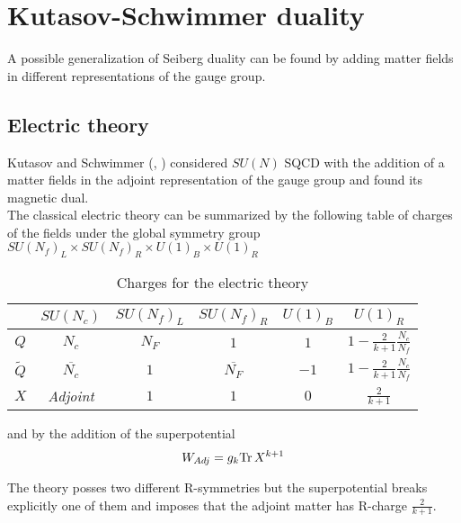 


\section{Kutasov-Schwimmer duality}

A possible generalization of Seiberg duality can be found by adding matter fields in different representations of the gauge group. \\

\subsection{Electric theory }
Kutasov and Schwimmer (\cite{Kutasov:1995ve}, \cite{Kutasov:1995np}) considered $SU(N)$ SQCD with the addition of a matter fields in the adjoint representation of the gauge group and found its magnetic dual.
\\
The classical electric theory can be summarized by the following table of charges of the fields under the global symmetry group $SU(N_f)_L \times SU(N_f)_R \times U(1)_B \times U(1)_R
$

\begin{table}[h]
\begin{tabular}{c | c | c c c c }
 & $SU(N_c)$ &$SU(N_f)_L$  &$SU(N_f)_R $  & $U(1)_B$ &  $U(1)_R$ \\
\hline
$Q$ & $N_c$&$N_F$ & $1$   &  $1$  & $ 1 - \frac{2}{k+1} \frac{N_c}{N_f}$  \\
$\tilde{Q}$ & $\overline{N_c} $&  $1$ & $\overline{ N_F}$   & $-1$   &  $ 1 - \frac{2}{k+1} \frac{N_c}{N_f} $   \\
$X$ & \emph{Adjoint} & $1$   &$ 1$    &$ 0$   &  $\frac{2}{k+1}$ \\
\end{tabular}
\centering
\caption{Charges for the electric theory}
\label{table:charge_table_el_ks_4d}
\end{table}
and by the addition of the superpotential
\begin{equation}
	W_{Adj} = g_k \mathrm{Tr } \,{X^{k+1}}
	\label{eqn:kutasov_superpotential_X}
\end{equation}

The theory posses two different R-symmetries but the superpotential breaks explicitly one of them and imposes that the adjoint matter has R-charge $\frac{2}{k+1}$.

